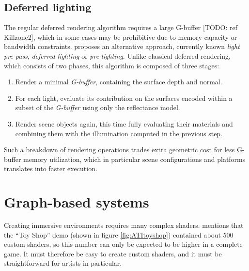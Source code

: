 \subsection{Deferred lighting}
\label{sec:DeferredLighting}

The regular deferred rendering algorithm requires a large G-buffer [TODO: ref Killzone2], which in some cases may be prohibitive due to memory capacity or bandwidth constraints. \citet{Engel08PrePass} proposes an alternative approach, currently known \emph{light pre-pass}, \emph{deferred lighting} or \emph{pre-lighting}. Unlike classical deferred rendering, which consists of two phases, this algorithm is composed of three stages:

\begin{enumerate}
\item Render a minimal \emph{G-buffer}, containing the surface depth and normal.
\item For each light, evaluate its contribution on the surfaces encoded within a subset of the \emph{G-buffer} using only the reflectance model.
\item Render scene objects again, this time fully evaluating their materials and combining them with the illumination computed in the previous step.
\end{enumerate}

Such a breakdown of rendering operations trades extra geometric cost for less G-buffer memory utilization, which in particular scene configurations and platforms translates into faster execution.


\section{Graph-based systems}

Creating immersive environments requires many complex shaders. \citet{Tatarchuk06ToyShop} mentions that the ``Toy Shop'' demo (shown in figure \ref{fig:ATItoyshop}) contained about 500 custom shaders, so this number can only be expected to be higher in a complete game. It must therefore be easy to create custom shaders, and it must be straightforward for artists in particular.

